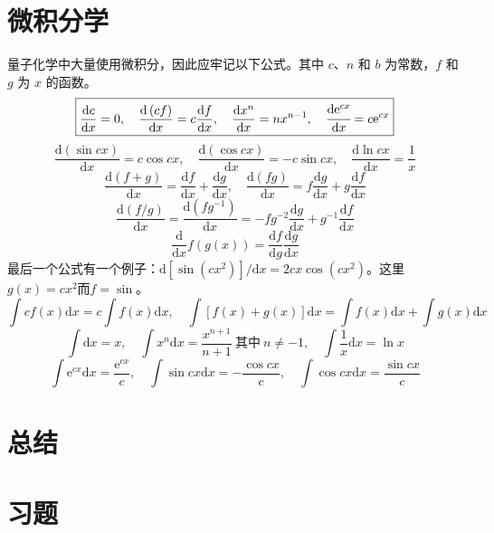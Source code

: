	\section{微积分学}
	量子化学中大量使用微积分，因此应牢记以下公式。其中 $c$、$n$ 和 $b$ 为常数，$f$ 和 $g$ 为 $x$ 的函数。
	\begin{equation*}
		\boxed{
			\frac{\mathrm{d}c}{\mathrm{d}x} = 0, \quad \frac{\mathrm{d}\left(cf\right)}{\mathrm{d}x} = c\frac{\mathrm{d}f}{\mathrm{d}x}, \quad \frac{\mathrm{d}x^n}{\mathrm{d}x} = nx^{n-1}, \quad \cfrac{\mathrm{d}\mathrm{e}^{cx}}{\mathrm{d}x} = c\mathrm{e}^{cx}
		}
	\end{equation*}
	\begin{equation*}
		\boxed{
			\frac{\mathrm{d}\left(\sin cx\right)}{\mathrm{d}x} = c \cos cx, \quad \frac{\mathrm{d} \left(\cos cx\right)}{\mathrm{d}x} = -c \sin cx, \quad \frac{\mathrm{d} \ln cx}{\mathrm{d} x } = \frac{1}{x}
		}
	\end{equation*}
	\begin{equation*}
		\boxed{
			\frac{\mathrm{d}\left(f+g\right)}{\mathrm{d}x} = \frac{\mathrm{d}f}{\mathrm{d}x}+\frac{\mathrm{d}g}{\mathrm{d}x}, \quad \frac{\mathrm{d}\left(fg\right)}{\mathrm{d}x} = f\frac{\mathrm{d}g}{\mathrm{d}x}+g\frac{\mathrm{d}f}{\mathrm{d}x}
		}
	\end{equation*}
	\begin{equation*}
		\boxed{
			\frac{\mathrm{d}\left(f/g\right)}{\mathrm{d}x} = \frac{\mathrm{d}\left(fg^{-1}\right)}{\mathrm{d}x} = -fg^{-2}\frac{\mathrm{d}g}{\mathrm{d}x}+g^{-1}\frac{\mathrm{d}f}{\mathrm{d}x}
		}
	\end{equation*}
	\begin{equation*}
		\boxed{
			\frac{\mathrm{d}}{\mathrm{d}x}f\left(g\left(x\right)\right) = \frac{\mathrm{d}f}{\mathrm{d}g}\frac{\mathrm{d}g}{\mathrm{d}x}
		}
	\end{equation*}
	最后一个公式有一个例子：$\mathrm{d}\left[\sin\left(cx^2\right)\right]/\mathrm{d}x = 2cx\cos\left(cx^2\right)$。这里$g\left(x\right) = cx^2$而$f=\sin$。
	\begin{equation*}
		\boxed{
			\int cf\left(x\right)\mathrm{d}x = c \int f\left(x\right)\mathrm{d}x, \quad \int \left[f\left(x\right)+g\left(x\right)\right]\mathrm{d}x = \int f\left(x\right)\mathrm{d}x+\int g\left(x\right)\mathrm{d}x
		}
	\end{equation*}
	\begin{equation*}
		\boxed{
			\int \mathrm{d}x = x, \quad \int x^n\mathrm{d}x = \frac{x^{n+1}}{n+1} \: \text{其中} \: n \neq -1, \quad \int \frac{1}{x}\mathrm{d}x = \ln x
		}
	\end{equation*}
	\begin{equation*}
		\boxed{
			\int \mathrm{e}^{cx}\mathrm{d}x = \frac{\mathrm{e}^{cx}}{c}, \quad \int \sin cx\mathrm{d}x = -\frac{\cos cx}{c}, \quad \int \cos cx\mathrm{d}x = \frac{\sin cx}{c}
		}
	\end{equation*}
	
	
	
	
	\section*{总结}

	\section*{习题}
